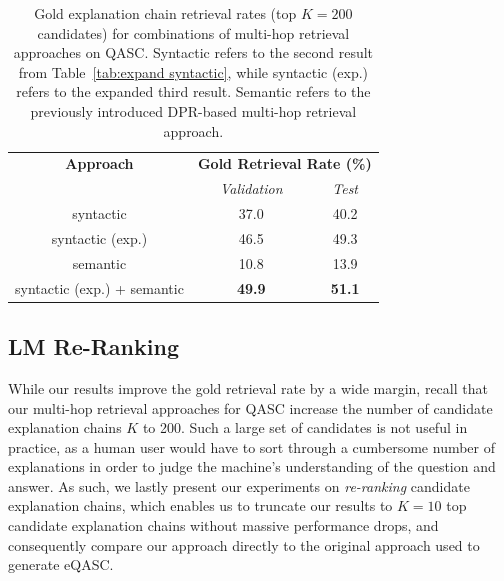 \documentclass[letterpaper]{article} %
\begin{document}
\begin{table}
    \centering
    \footnotesize
    \begin{tabular}{c|cc}
    \toprule
        \textbf{Approach}  & \multicolumn{2}{c}{\textbf{Gold Retrieval Rate (\%)}} \\
         & \textit{Validation} & \textit{Test} \\\midrule
        syntactic & 37.0 & 40.2 \\
        syntactic (exp.) & 46.5 & 49.3 \\
        semantic & 10.8 & 13.9 \\
        syntactic (exp.) + semantic & \textbf{49.9} & \textbf{51.1} \\
        \bottomrule
    \end{tabular}
    \normalsize
    \caption{Gold explanation chain retrieval rates (top $K=200$ candidates) for combinations of multi-hop retrieval approaches on QASC. Syntactic refers to the second result from Table~\ref{tab:expand syntactic}, while syntactic (exp.) refers to the expanded third result. Semantic refers to the previously introduced DPR-based multi-hop retrieval approach.}
    \label{tab:semantic}
\end{table}


\subsection{LM Re-Ranking}
While our results improve the gold retrieval rate by a wide margin, recall that our multi-hop retrieval approaches for QASC increase the number of candidate explanation chains $K$ to 200. Such a large set of candidates is not useful in practice, as a human user would have to sort through a cumbersome number of explanations in order to judge the machine's understanding of the question and answer. As such, we lastly present our experiments on \textit{re-ranking} candidate explanation chains, which enables us to truncate our results to $K=10$ top candidate explanation chains without massive performance drops, and consequently compare our approach directly to the original approach used to generate eQASC.
\end{document}
